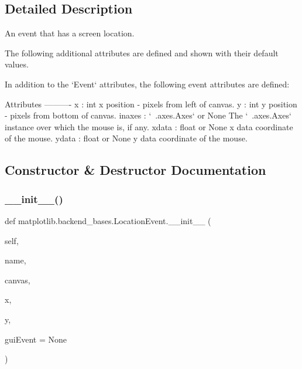 \subsection{Detailed Description}
\begin{DoxyVerb}An event that has a screen location.

The following additional attributes are defined and shown with
their default values.

In addition to the `Event` attributes, the following
event attributes are defined:

Attributes
----------
x : int
    x position - pixels from left of canvas.
y : int
    y position - pixels from bottom of canvas.
inaxes : `~.axes.Axes` or None
    The `~.axes.Axes` instance over which the mouse is, if any.
xdata : float or None
    x data coordinate of the mouse.
ydata : float or None
    y data coordinate of the mouse.
\end{DoxyVerb}
 

\subsection{Constructor \& Destructor Documentation}
\mbox{\label{classmatplotlib_1_1backend__bases_1_1LocationEvent_ad017d901547558c823b273c601d2f8a5}} 
\subsubsection{\texorpdfstring{\+\_\+\+\_\+init\+\_\+\+\_\+()}{\_\_init\_\_()}}
{\footnotesize\ttfamily def matplotlib.\+backend\+\_\+bases.\+Location\+Event.\+\_\+\+\_\+init\+\_\+\+\_\+ (\begin{DoxyParamCaption}\item[{}]{self,  }\item[{}]{name,  }\item[{}]{canvas,  }\item[{}]{x,  }\item[{}]{y,  }\item[{}]{gui\+Event = {\ttfamily None} }\end{DoxyParamCaption})}

